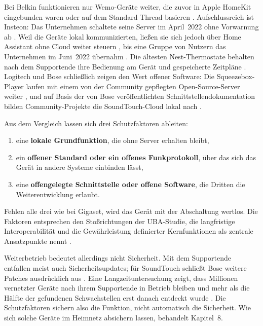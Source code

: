 Bei Belkin funktionieren nur Wemo-Geräte weiter, die zuvor in Apple HomeKit
eingebunden waren oder auf dem Standard Thread basieren
\autocite[vgl.][]{belkin:2026}. Aufschlussreich ist Insteon: Das Unternehmen
schaltete seine Server im April~2022 ohne Vorwarnung ab
\autocite[vgl.][]{rogerson:2022a}. Weil die Geräte lokal kommunizierten,
ließen sie sich jedoch über Home Assistant ohne Cloud weiter steuern
\autocite[vgl.][]{schoutsen:2022}, bis eine Gruppe von Nutzern das
Unternehmen im Juni~2022 übernahm \autocite[vgl.][]{rogerson:2022b}. Die
ältesten Nest-Thermostate behalten nach dem Supportende ihre Bedienung am
Gerät und gespeicherte Zeitpläne \autocites[vgl.][]{google:2025}{heise:2025a}.
Logitech und Bose schließlich zeigen den Wert offener Software: Die
Squeezebox-Player laufen mit einem von der Community gepflegten
Open-Source-Server weiter \autocites[vgl.][]{golem:2024}{lyrion:oj}, und auf
Basis der von Bose veröffentlichten Schnittstellendokumentation bilden
Community-Projekte die SoundTouch-Cloud lokal nach
\autocites[vgl.][]{rudra:2026}{gesellix:2026}.

Aus dem Vergleich lassen sich drei Schutzfaktoren ableiten:
\begin{enumerate}
  \item eine \textbf{lokale Grundfunktion}, die ohne Server erhalten bleibt,
  \item ein \textbf{offener Standard oder ein offenes Funkprotokoll}, über
        das sich das Gerät in andere Systeme einbinden lässt,
  \item eine \textbf{offengelegte Schnittstelle oder offene Software}, die
        Dritten die Weiterentwicklung erlaubt.
\end{enumerate}
Fehlen alle drei wie bei Gigaset, wird das Gerät mit der Abschaltung wertlos.
Die Faktoren entsprechen den Stoßrichtungen der \acrshort{UBA}-Studie, die
langfristige Interoperabilität und die Gewährleistung definierter
Kernfunktionen als zentrale Ansatzpunkte nennt
\autocite[vgl.][S.~14]{jaegererben:2023}.

Weiterbetrieb bedeutet allerdings nicht Sicherheit. Mit dem Supportende
entfallen meist auch Sicherheitsupdates; für SoundTouch schließt Bose weitere
Patches ausdrücklich aus \autocite[vgl.][]{stereoguide:2026}. Eine
Langzeituntersuchung zeigt, dass Millionen vernetzter Geräte nach ihrem
Supportende in Betrieb bleiben und mehr als die Hälfte der gefundenen
Schwachstellen erst danach entdeckt wurde \autocite[vgl.][]{wang:2023}. Die
Schutzfaktoren sichern also die Funktion, nicht automatisch die Sicherheit.
Wie sich solche Geräte im Heimnetz absichern lassen, behandelt Kapitel~8.

